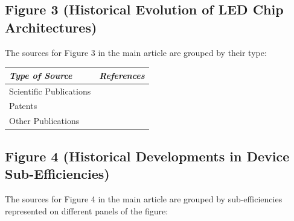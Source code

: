 \documentclass[10pt]{article}
\begin{document}
\subsection{Figure 3 (Historical Evolution of LED Chip Architectures)}

The sources for Figure 3 in the main article are grouped by their type:

\begin{table}[h!]
    \begin{tabularx}{\textwidth}{|l|X|}
    \hline
    \textit{Type of Source} & \textit{References} \\
    \hline
    Scientific Publications & \cite{plossl2010wafer}\cite{bierhuizen2007performance}\cite{gencc2019distributed}\cite{chong2014performance} \\
    \hline
    Patents & \cite{patent1999uemura}\cite{patent1998takaoka}\cite{patent1999komaki}\cite{patent1999komaki}\cite{ludowise2006resonant}\cite{camras2005iii}\cite{steigerwald2004contacting} \\
    \hline
    Other Publications & \cite{craford2015}\cite{sun2016}\cite{yole2013packaging} \\
    \hline
    \end{tabularx}
\end{table}

\subsection{Figure 4 (Historical Developments in Device Sub-Efficiencies)}

The sources for Figure 4 in the main article are grouped by sub-efficiencies represented on different panels of the figure:
\end{document}
